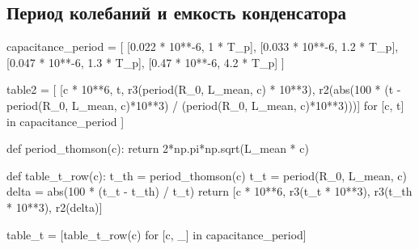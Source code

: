 \documentclass[12pt, a4paper]{article}
\begin{document}
\subsection*{Период колебаний и емкость конденсатора}

\begin{pycode}
capacitance_period = [
  [0.022 * 10**-6, 1 * T_p],
  [0.033 * 10**-6, 1.2 * T_p],
  [0.047 * 10**-6, 1.3 * T_p],
  [0.47 * 10**-6, 4.2 * T_p]
]

table2 = [
  [c * 10**6, t, r3(period(R_0, L_mean, c) * 10**3), r2(abs(100 * (t - period(R_0, L_mean, c)*10**3) / (period(R_0, L_mean, c)*10**3)))]
  for [c, t] in capacitance_period
]

def period_thomson(c): return 2*np.pi*np.sqrt(L_mean * c)

def table_t_row(c):
  t_th = period_thomson(c)
  t_t = period(R_0, L_mean, c)
  delta = abs(100 * (t_t - t_th) / t_t)
  return [c * 10**6, r3(t_t * 10**3), r3(t_th * 10**3), r2(delta)]

table_t = [table_t_row(c) for [c, _] in capacitance_period]
\end{pycode}
\end{document}
